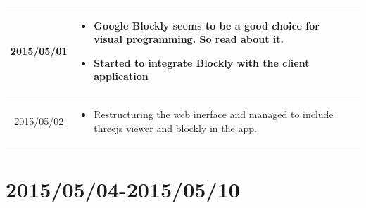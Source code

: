 \documentclass[11pt]{article} %
\begin{document}
\begin{center}
\begin{longtable}{ | c | p{6cm} | p{5cm} |}
  2015/05/01         & 
  \begin{itemize}
  \item Google Blockly seems to be a good choice for visual programming. So read about it.
  \item Started to integrate Blockly with the client application
\end{itemize}   
  & 
\\
  										 \hline
  										 
	 2015/05/02         & 
  \begin{itemize}
  \item Restructuring the web inerface and managed to include threejs viewer and blockly in the app.
  \end{itemize}
  & 
		\\					 \hline  	
										 
  										   								 
    \end{longtable}
\end{center}

\newpage
\section{2015/05/04-2015/05/10}
\end{document}
